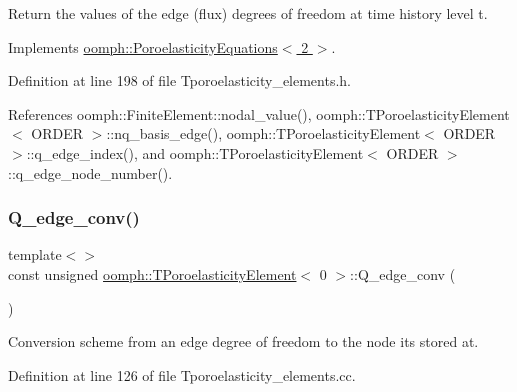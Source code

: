Return the values of the edge (flux) degrees of freedom at time history level t. 



Implements \hyperlink{classoomph_1_1PoroelasticityEquations_aed66c1aeaa3cadb53537c5a74684ddec}{oomph\+::\+Poroelasticity\+Equations$<$ 2 $>$}.



Definition at line 198 of file Tporoelasticity\+\_\+elements.\+h.



References oomph\+::\+Finite\+Element\+::nodal\+\_\+value(), oomph\+::\+T\+Poroelasticity\+Element$<$ O\+R\+D\+E\+R $>$\+::nq\+\_\+basis\+\_\+edge(), oomph\+::\+T\+Poroelasticity\+Element$<$ O\+R\+D\+E\+R $>$\+::q\+\_\+edge\+\_\+index(), and oomph\+::\+T\+Poroelasticity\+Element$<$ O\+R\+D\+E\+R $>$\+::q\+\_\+edge\+\_\+node\+\_\+number().

\mbox{\label{classoomph_1_1TPoroelasticityElement_ae1f1a50ca99931bd44d2b4d02b525ca3}} 
\subsubsection{\texorpdfstring{Q\+\_\+edge\+\_\+conv()}{Q\_edge\_conv()}\hspace{0.1cm}{\footnotesize\ttfamily [1/2]}}
{\footnotesize\ttfamily template$<$$>$ \\
const unsigned \hyperlink{classoomph_1_1TPoroelasticityElement}{oomph\+::\+T\+Poroelasticity\+Element}$<$ 0 $>$\+::Q\+\_\+edge\+\_\+conv (\begin{DoxyParamCaption}{ }\end{DoxyParamCaption})\hspace{0.3cm}{\ttfamily [private]}}



Conversion scheme from an edge degree of freedom to the node it\textquotesingle{}s stored at. 



Definition at line 126 of file Tporoelasticity\+\_\+elements.\+cc.

\mbox{\label{classoomph_1_1TPoroelasticityElement_a0e5fa28382d50931180aa018bd78a8b5}} 

